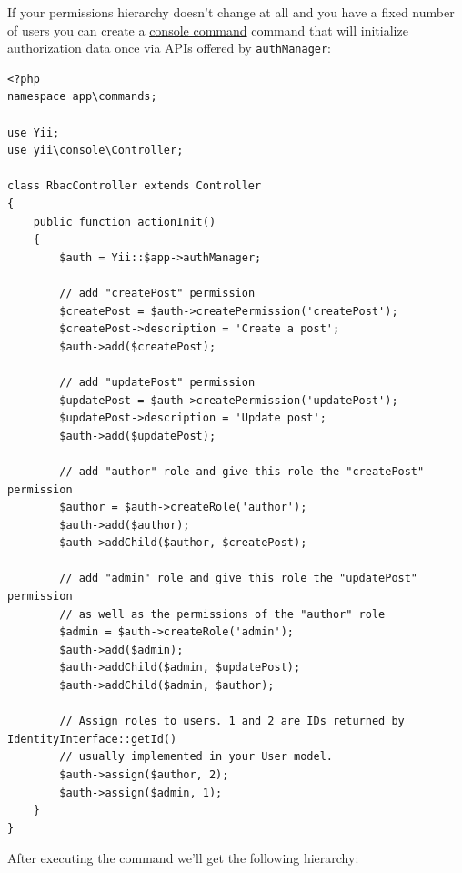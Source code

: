 If your permissions hierarchy doesn't change at all and you have a fixed number of users you can create a
\hyperref[tutorial-console.md::create-command]{console command} command that will initialize authorization data once via APIs offered by \lstinline|authManager|:

\lstset{language=php}\begin{lstlisting}
<?php
namespace app\commands;

use Yii;
use yii\console\Controller;

class RbacController extends Controller
{
    public function actionInit()
    {
        $auth = Yii::$app->authManager;

        // add "createPost" permission
        $createPost = $auth->createPermission('createPost');
        $createPost->description = 'Create a post';
        $auth->add($createPost);

        // add "updatePost" permission
        $updatePost = $auth->createPermission('updatePost');
        $updatePost->description = 'Update post';
        $auth->add($updatePost);

        // add "author" role and give this role the "createPost" permission
        $author = $auth->createRole('author');
        $auth->add($author);
        $auth->addChild($author, $createPost);

        // add "admin" role and give this role the "updatePost" permission
        // as well as the permissions of the "author" role
        $admin = $auth->createRole('admin');
        $auth->add($admin);
        $auth->addChild($admin, $updatePost);
        $auth->addChild($admin, $author);

        // Assign roles to users. 1 and 2 are IDs returned by IdentityInterface::getId()
        // usually implemented in your User model.
        $auth->assign($author, 2);
        $auth->assign($admin, 1);
    }
}
\end{lstlisting}
After executing the command we'll get the following hierarchy:

